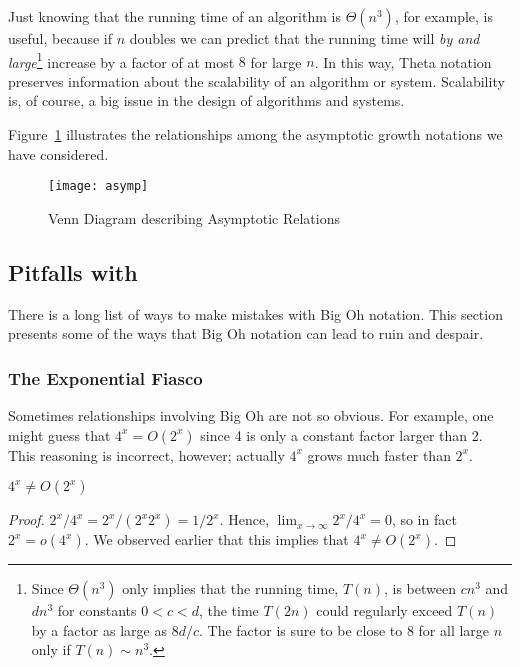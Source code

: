 Just knowing that the running time of an algorithm is $\varTheta(n^3)$, for
example, is useful, because if $n$ doubles we can predict that the running
time will \emph{by and large}\footnote{Since $\varTheta(n^3)$ only implies
that the running time, $T(n)$, is between $cn^3$ and $dn^3$ for constants
$0<c<d$, the time $T(2n)$ could regularly exceed $T(n)$ by a factor as large
as $8d/c$.  The factor is sure to be close to 8 for all large $n$ only if
$T(n) \sim n^3$.} increase by a factor of at most $8$ for large $n$.  In
this way, Theta notation preserves information about the scalability of an
algorithm or system.  Scalability is, of course, a big issue in the design
of algorithms and systems.

\begin{editingnotes}

Figure~\ref{asymp} illustrates the relationships among the asymptotic
growth notations we have considered.

\begin{figure}[h]
\begin{center}
\texttt{[image: asymp]}
\end{center}
\caption{Venn Diagram describing Asymptotic Relations}
\label{asymp}
\end{figure}

\end{editingnotes}


\subsection{Pitfalls with }

There is a long list of ways to make mistakes with Big Oh notation.
This section presents some of the ways that Big Oh notation can lead
to ruin and despair.

\subsubsection{The Exponential Fiasco}

Sometimes relationships involving Big Oh are not so obvious.  For
example, one might guess that $4^x = O(2^x)$ since 4 is only a
constant factor larger than 2.  This reasoning is incorrect,
however; actually $4^x$ grows much faster than $2^x$.

\begin{proposition}
$4^x \neq O(2^x)$
\end{proposition}

\begin{proof}
$2^x/4^x = 2^x/(2^x2^x) = 1/2^x$.  Hence, $\lim_{x \rightarrow \infty}
2^x/4^x = 0$, so in fact $2^x = o(4^x)$.  We observed earlier that this
implies that $4^x \neq O(2^x)$.
\end{proof}

